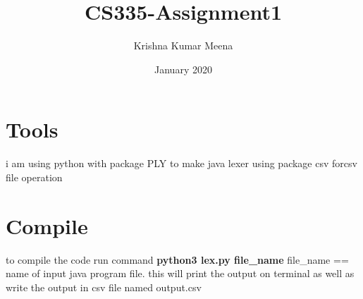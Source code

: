 \documentclass{article}
\title{CS335-Assignment1}
\author{Krishna Kumar Meena }
\date{January 2020}
\begin{document}
\maketitle

\section*{Tools}
i am using python with package PLY to make java lexer \newline
using package csv forcsv file operation

\section*{Compile}
to compile the code run command \newline \newline
{\large\textbf{python3 lex.py file\_name}} \newline
file\_name == name of input java program file.\newline \newline
this will print the output on terminal as well as write the output in csv file named output.csv
\end{document}
